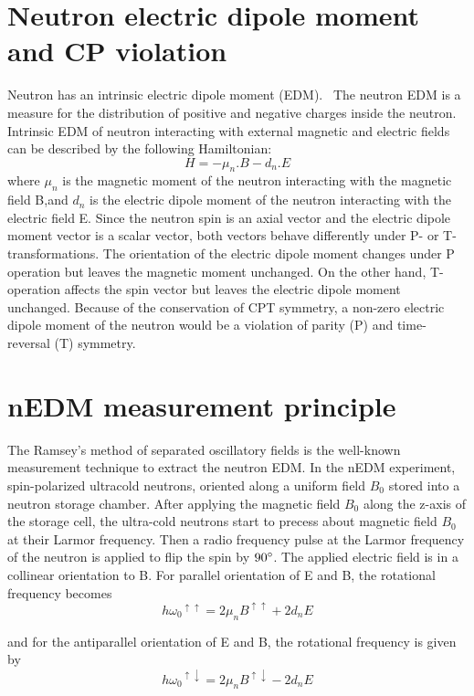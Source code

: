 \section{Neutron electric dipole moment and CP violation }  
Neutron has an intrinsic electric dipole moment (EDM).  ~The neutron
EDM is a measure for the distribution of positive and negative charges
inside the neutron\cite{wiki:yyy}. Intrinsic EDM of neutron
interacting with external magnetic and electric fields can be
described by the following Hamiltonian:
\begin{equation}\label{my_first_eqn}  
  H=-\mu_n.B-d_n.E
\end{equation}
where $\mu_n$ is the magnetic moment of the neutron interacting with the magnetic field B,and $d_n$ is the electric dipole moment of the neutron interacting with the electric field E.
Since the neutron spin is an axial vector and the electric dipole moment vector is a scalar
vector, both vectors behave differently under P- or T-transformations.  The orientation of the electric dipole moment changes under P operation  but leaves the magnetic moment unchanged. On the other hand, T-operation affects the spin vector but leaves the electric dipole moment unchanged.
 Because of the conservation of CPT symmetry, a non-zero electric dipole moment of the neutron would be a violation of parity (P) and time-reversal (T) symmetry.

\section{nEDM measurement principle}
The Ramsey's method of separated oscillatory fields is the well-known measurement technique
to extract the neutron EDM. In the nEDM experiment, spin-polarized ultracold neutrons, oriented along a uniform field $B_0$ stored into a neutron storage chamber. After applying the magnetic field $B_0$ along the z-axis of the storage cell, the ultra-cold neutrons start to precess about magnetic field $B_0$ at their Larmor frequency.  Then a radio frequency pulse at the Larmor frequency of the neutron is applied to flip the spin by $90 \degree$. The applied electric field is in a collinear orientation to B.  For parallel orientation of E and B, the rotational frequency becomes
\begin{equation}\label{my_first_eqn}  
    h{\omega_0}^ {\uparrow\uparrow}=2\mu_n {B}^{\uparrow\uparrow}+ 2 d_nE
\end{equation}
            
and for the antiparallel orientation of E and B, the rotational frequency is given by
\begin{equation}\label{my_first_eqn}  
    h{\omega_0}^ {\uparrow\downarrow}=2\mu_n {B}^{\uparrow\downarrow}- 2 d_nE
\end{equation}

